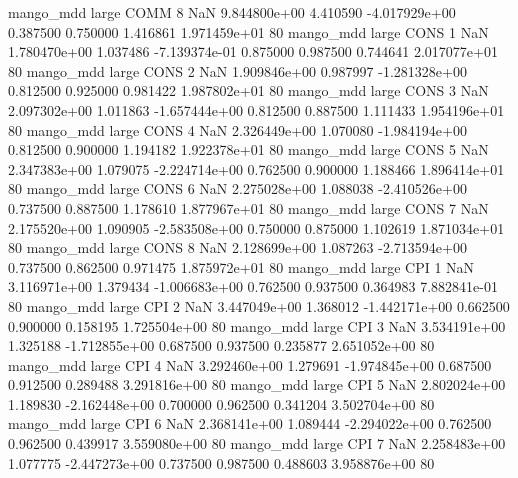         mango_mdd      large     COMM                 8                  NaN 9.844800e+00      4.410590 -4.017929e+00 0.387500 0.750000       1.416861 1.971459e+01 80
        mango_mdd      large     CONS                 1                  NaN 1.780470e+00      1.037486 -7.139374e-01 0.875000 0.987500       0.744641 2.017077e+01 80
        mango_mdd      large     CONS                 2                  NaN 1.909846e+00      0.987997 -1.281328e+00 0.812500 0.925000       0.981422 1.987802e+01 80
        mango_mdd      large     CONS                 3                  NaN 2.097302e+00      1.011863 -1.657444e+00 0.812500 0.887500       1.111433 1.954196e+01 80
        mango_mdd      large     CONS                 4                  NaN 2.326449e+00      1.070080 -1.984194e+00 0.812500 0.900000       1.194182 1.922378e+01 80
        mango_mdd      large     CONS                 5                  NaN 2.347383e+00      1.079075 -2.224714e+00 0.762500 0.900000       1.188466 1.896414e+01 80
        mango_mdd      large     CONS                 6                  NaN 2.275028e+00      1.088038 -2.410526e+00 0.737500 0.887500       1.178610 1.877967e+01 80
        mango_mdd      large     CONS                 7                  NaN 2.175520e+00      1.090905 -2.583508e+00 0.750000 0.875000       1.102619 1.871034e+01 80
        mango_mdd      large     CONS                 8                  NaN 2.128699e+00      1.087263 -2.713594e+00 0.737500 0.862500       0.971475 1.875972e+01 80
        mango_mdd      large      CPI                 1                  NaN 3.116971e+00      1.379434 -1.006683e+00 0.762500 0.937500       0.364983 7.882841e-01 80
        mango_mdd      large      CPI                 2                  NaN 3.447049e+00      1.368012 -1.442171e+00 0.662500 0.900000       0.158195 1.725504e+00 80
        mango_mdd      large      CPI                 3                  NaN 3.534191e+00      1.325188 -1.712855e+00 0.687500 0.937500       0.235877 2.651052e+00 80
        mango_mdd      large      CPI                 4                  NaN 3.292460e+00      1.279691 -1.974845e+00 0.687500 0.912500       0.289488 3.291816e+00 80
        mango_mdd      large      CPI                 5                  NaN 2.802024e+00      1.189830 -2.162448e+00 0.700000 0.962500       0.341204 3.502704e+00 80
        mango_mdd      large      CPI                 6                  NaN 2.368141e+00      1.089444 -2.294022e+00 0.762500 0.962500       0.439917 3.559080e+00 80
        mango_mdd      large      CPI                 7                  NaN 2.258483e+00      1.077775 -2.447273e+00 0.737500 0.987500       0.488603 3.958876e+00 80
